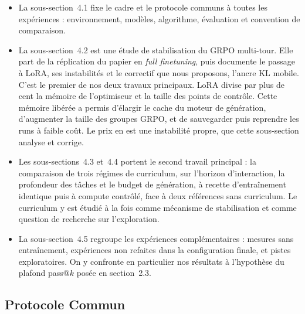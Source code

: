 \documentclass[11pt,a4paper]{article}
\begin{document}
\begin{itemize}
    \item La sous-section~4.1 fixe le cadre et le protocole communs à toutes les expériences : environnement, modèles, algorithme, évaluation et convention de comparaison.
    \item La sous-section~4.2 est une étude de stabilisation du GRPO multi-tour. Elle part de la réplication du papier en \emph{full finetuning}, puis documente le passage à LoRA, ses instabilités et le correctif que nous proposons, l'ancre KL mobile. C'est le premier de nos deux travaux principaux. LoRA divise par plus de cent la mémoire de l'optimiseur et la taille des points de contrôle. Cette mémoire libérée a permis d'élargir le cache du moteur de génération, d'augmenter la taille des groupes GRPO, et de sauvegarder puis reprendre les runs à faible coût. Le prix en est une instabilité propre, que cette sous-section analyse et corrige.
    \item Les sous-sections~4.3 et~4.4 portent le second travail principal : la comparaison de trois régimes de curriculum, sur l'horizon d'interaction, la profondeur des tâches et le budget de génération, à recette d'entraînement identique puis à compute contrôlé, face à deux références sans curriculum. Le curriculum y est étudié à la fois comme mécanisme de stabilisation et comme question de recherche sur l'exploration.
    \item La sous-section~4.5 regroupe les expériences complémentaires : mesures sans entraînement, expériences non refaites dans la configuration finale, et pistes exploratoires. On y confronte en particulier nos résultats à l'hypothèse du plafond pass@$k$ posée en section~2.3.
\end{itemize}





\vspace{2cm}

\subsection{Protocole Commun}\label{subsec:protocole}
\end{document}
